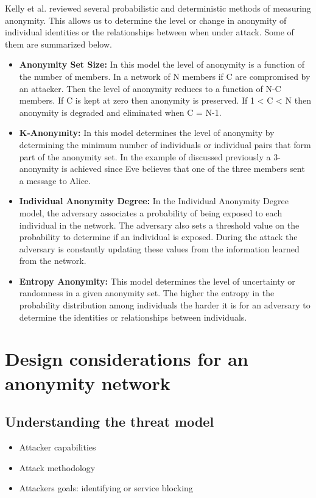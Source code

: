 \documentclass{llncs}
\begin{document}
Kelly et al. \cite{kelly2012exploring} reviewed several probabilistic and deterministic methods of measuring anonymity. This allows us to determine the level or change in anonymity of individual identities or the relationships between when under attack. Some of them are summarized below. 
\begin{itemize}
	\item[]{\textbf{Anonymity Set Size:} In this model the level of anonymity is a function of the number of members. In a network of N members if C are compromised by an attacker. Then the level of anonymity reduces to a function of N-C members. If C is kept at zero then anonymity is preserved. If 1 < C < N then anonymity is degraded and eliminated when C = N-1.}
	\item[]{\textbf{K-Anonymity:} In this model determines the level of anonymity by determining the minimum number of individuals or individual pairs that form part of the anonymity set. In the example of discussed previously a 3-anonymity is achieved since Eve believes that one of the three members sent a message to Alice.}
	\item[]{\textbf{Individual Anonymity Degree:} In the Individual Anonymity Degree model, the adversary associates a probability of being exposed to each individual in the network. The adversary also sets a threshold value on the probability to determine if an individual is exposed. During the attack the adversary is constantly updating these values from the information learned from the network.}
	\item[]{\textbf{Entropy Anonymity:} This model determines the level of uncertainty or randomness in a given anonymity set. The higher the entropy in the probability distribution among individuals the harder it is for an adversary to determine the identities or relationships between individuals.}
\end{itemize}

\section{Design considerations for an anonymity network} \label{design}
\subsection{Understanding the threat model}
\begin{itemize}
	\item{Attacker capabilities}
	\item{Attack methodology}
	\item{Attackers goals: identifying or service blocking}
\end{itemize}
\end{document}
